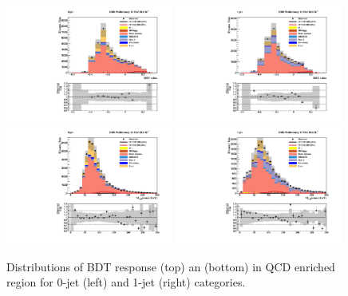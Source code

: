 \begin{figure}[!htpb]\centering
 \captionsetup{width=.96\textwidth,justification=centering}
 \includegraphics[width=0.49\textwidth]{plots_and_figures/chapter6/qcd_cr/0_preselection_BDT_value.pdf}
 \includegraphics[width=0.49\textwidth]{plots_and_figures/chapter6/qcd_cr/1_preselection_BDT_value.pdf} \\
 \includegraphics[width=0.49\textwidth]{plots_and_figures/chapter6/qcd_cr/0_preselection_h_collmass_pfmet.pdf} 
 \includegraphics[width=0.49\textwidth]{plots_and_figures/chapter6/qcd_cr/1_preselection_h_collmass_pfmet.pdf} \\

 \caption{Distributions of BDT response (top) an \mcol (bottom) in QCD enriched region for 0-jet (left)  and 1-jet (right) categories.}
 \label{fig:qcd_cr}
\end{figure}

